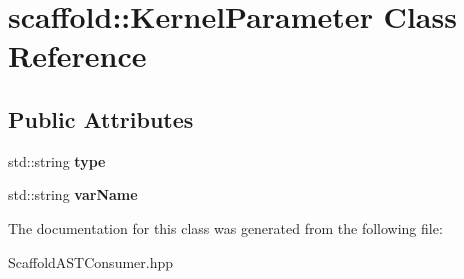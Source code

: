\hypertarget{a01228}{}\section{scaffold\+:\+:Kernel\+Parameter Class Reference}
\label{a01228}
\subsection*{Public Attributes}
\begin{DoxyCompactItemize}
\item 
\mbox{\label{a01228_a3bebbd2395a086f511a2e2a148fd8297}} 
std\+::string {\bfseries type}
\item 
\mbox{\label{a01228_a0e97624c076ac64a02b94fbef11a1ece}} 
std\+::string {\bfseries var\+Name}
\end{DoxyCompactItemize}


The documentation for this class was generated from the following file\+:\begin{DoxyCompactItemize}
\item 
Scaffold\+A\+S\+T\+Consumer.\+hpp\end{DoxyCompactItemize}
